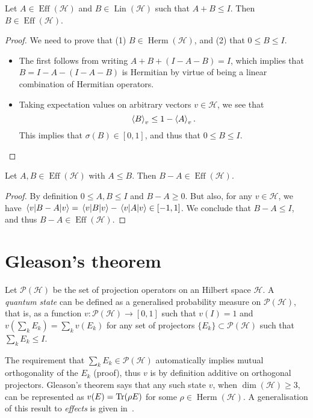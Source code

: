 \documentclass[a4paper]{report}
\newcommand{\on}[1]{\operatorname{#1}}
\newcommand{\calH}{{\mathcal{H}}}
\newcommand{\calP}{{\mathcal{P}}}
\DeclareMathOperator{\Herm}{Herm}
\DeclareMathOperator{\Lin}{Lin}
\begin{document}
\begin{prop}
	Let $A\in\on{Eff}(\calH)$ and $B\in\Lin(\calH)$ such that $A+B\le I$.
	Then $B\in\on{Eff}(\calH)$.
\end{prop}
\begin{proof}
	We need to prove that (1) $B\in\Herm(\calH)$, and (2) that $0\le B\le I$.
	\begin{itemize}
		\item The first follows from writing $A+B+(I-A-B)=I$, which implies that $B=I - A - (I-A-B)$ is Hermitian by virtue of being a linear combination of Hermitian operators.
		\item Taking expectation values on arbitrary vectors $v\in\calH$, we see that
		\begin{equation}
			\expval{B}_v \le 1 - \expval{A}_v.
		\end{equation}
		This implies that $\sigma(B)\in[0,1]$, and thus that $0\le B\le I$.
	\end{itemize}
\end{proof}

\begin{prop}
	Let $A,B\in\on{Eff}(\calH)$ with $A\le B$. Then $B-A\in\on{Eff}(\calH)$.
	\label{prop:diff_of_effects_is_effect}
\end{prop}
\begin{proof}
	By definition $0\le A,B\le I$ and $B-A\ge 0$.
	But also, for any $v\in\calH$, we have
	$\mel{v}{B-A}{v}=\mel{v}{B}{v}-\mel{v}{A}{v}\in[-1,1]$.
	We conclude that $B-A\le I$, and thus $B-A\in\on{Eff}(\calH)$.
\end{proof}


\section{Gleason's theorem}

\begin{defn}
	Let $\calP(\calH)$ be the set of projection operators on an Hilbert space $\calH$. A \emph{quantum state} can be defined as a generalised probability measure on $\calP(\calH)$, that is, as a function $v:\calP(\calH)\to[0,1]$ such that $v(I)=1$ and
	$v(\sum_k E_k) = \sum_k v(E_k)$
	for any set of projectors $\{E_k\}\subset\calP(\calH)$ such that $\sum_k E_k\le I$.
\end{defn}
The requirement that $\sum_k E_k\in\calP(\calH)$ automatically implies mutual orthogonality of the $E_k$ (proof), thus $v$ is by definition additive on orthogonal projectors.
Gleason's theorem says that any such state $v$, when $\dim(\calH)\ge3$, can be represented as $v(E)=\Tr(\rho E)$ for some $\rho\in\Herm(\calH)$.
A generalisation of this result to \emph{effects} is given in~\parencite{busch2003quantum,caves2004gleasontype}.
\end{document}
